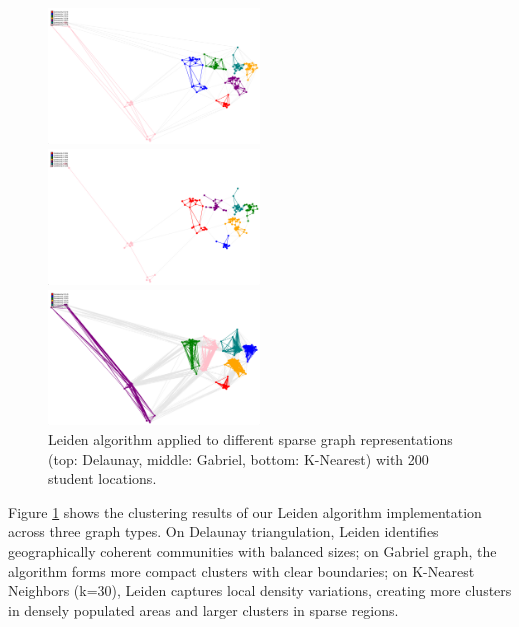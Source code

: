 \begin{figure}[H]
\centering
\includegraphics[width=0.5\textwidth]{./img/Leiden_Delaunay}
\vspace{0.5cm}

\includegraphics[width=0.5\textwidth]{./img/Leiden_Gabriel}
\vspace{0.5cm}

\includegraphics[width=0.5\textwidth]{./img/Leiden_K}

\caption{Leiden algorithm applied to different sparse graph representations (top: Delaunay, middle: Gabriel, bottom: K-Nearest) with 200 student locations.}
\label{fig:leiden_clustering}
\end{figure}

Figure \ref{fig:leiden_clustering} shows the clustering results of our Leiden algorithm implementation across three graph types. On Delaunay triangulation, Leiden identifies geographically coherent communities with balanced sizes; on Gabriel graph, the algorithm forms more compact clusters with clear boundaries; on K-Nearest Neighbors (k=30), Leiden captures local density variations, creating more clusters in densely populated areas and larger clusters in sparse regions.

